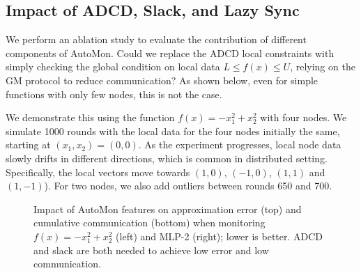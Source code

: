 \subsection{Impact of ADCD, Slack, and Lazy Sync} \label{sub_sec:rlv_and_lazy_sync}

We perform an ablation study to evaluate the contribution of different components of AutoMon.
Could we replace the ADCD local constraints with simply checking the global condition on local data $L \leq f(x) \leq U$, relying on the GM protocol to reduce communication?
As shown below, even for simple functions with only few nodes, this is not the case.


We demonstrate this using the function $f(x) = -x_1^2 + x_2^2$ with four nodes.
We simulate 1000 rounds with the local data for the four nodes initially the same, starting at $(x_1, x_2)=(0,0)$.
As the experiment progresses, local node data slowly drifts in different directions, which is common in distributed setting. Specifically, the local vectors move towards $(1,0)$, $(-1,0)$, $(1,1)$ and $(1,-1)$).
For two nodes, we also add outliers between rounds 650 and 700.


\begin{figure}
	\centering
	\caption{
	    Impact of AutoMon features on approximation error (top) and cumulative communication (bottom) when monitoring $f(x)=-x_1^2+x_2^2$ (left) and MLP-2 (right); lower is better.
		ADCD and slack are both needed to achieve low error and low communication.
	}
	\label{fig:monitoring_stats}
\end{figure}


